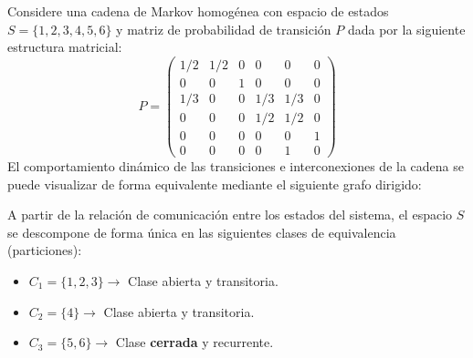 \begin{ejemplo}
    Considere una cadena de Markov homogénea con espacio de estados $S = \{1, 2, 3, 4, 5, 6\}$ y matriz de probabilidad de transición $P$ dada por la siguiente estructura matricial:
    \[
    P = 
    \begin{pmatrix}
        1/2 & 1/2 & 0 & 0 & 0 & 0 \\
        0 & 0 & 1 & 0 & 0 & 0 \\
        1/3 & 0 & 0 & 1/3 & 1/3 & 0 \\
        0 & 0 & 0 & 1/2 & 1/2 & 0 \\
        0 & 0 & 0 & 0 & 0 & 1 \\
        0 & 0 & 0 & 0 & 1 & 0
    \end{pmatrix}
    \]
    El comportamiento dinámico de las transiciones e interconexiones de la cadena se puede visualizar de forma equivalente mediante el siguiente grafo dirigido:

    \begin{center}
    \end{center}
    A partir de la relación de comunicación entre los estados del sistema, el espacio $S$ se descompone de forma única en las siguientes clases de equivalencia (particiones):
    \begin{itemize}
        \item $C_1 = \{1, 2, 3\} \longrightarrow$ Clase abierta y transitoria.
        \item $C_2 = \{4\} \longrightarrow$ Clase abierta y transitoria.
        \item $C_3 = \{5, 6\} \longrightarrow$ Clase \textbf{cerrada} y recurrente.
    \end{itemize}
\end{ejemplo}

